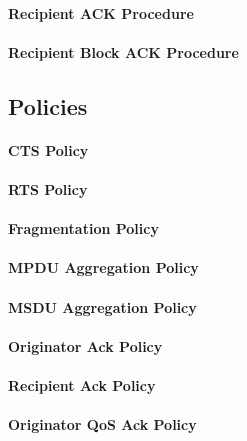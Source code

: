 %
\paragraph{Recipient ACK Procedure}
%

%
\paragraph{Recipient Block ACK Procedure}
%

\subsection{Policies}
\label{subsec:ieee-802.11-policies}
%

%
\paragraph{CTS Policy}
%

%
\paragraph{RTS Policy}
%

%
\paragraph{Fragmentation Policy}
%

%
\paragraph{MPDU Aggregation Policy}
%

%
\paragraph{MSDU Aggregation Policy}
%

%
\paragraph{Originator Ack Policy}
%

%
\paragraph{Recipient Ack Policy}
%

%
\paragraph{Originator QoS Ack Policy}
%

